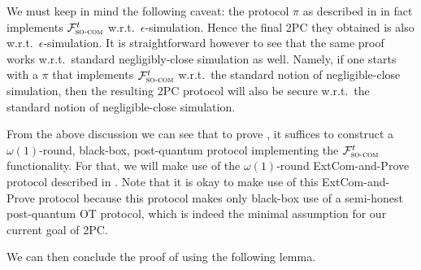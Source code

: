 We must keep in mind the following caveat: the protocol $\pi$ as described in \cite[Section 7.4]{C:CCLY22} in fact implements $\mathcal{F}^t_\textsc{so-com}$ w.r.t.\ $\epsilon$-simulation. Hence the final 2PC they obtained is also w.r.t.\ $\epsilon$-simulation. It is straightforward however to see that the same proof works w.r.t.\ standard negligibly-close simulation as well. Namely, if one starts with a $\pi$ that implements $\mathcal{F}^t_\textsc{so-com}$ w.r.t.\ the standard notion of negligible-close simulation, then the resulting 2PC protocol will also be secure w.r.t.\ the standard notion of negligible-close simulation.


 From the above discussion we can see that to prove , it suffices to construct a $\omega(1)$-round, black-box, post-quantum protocol implementing the $\mathcal{F}^t_\textsc{so-com}$ functionality. For that, we will make use of the $\omega(1)$-round ExtCom-and-Prove protocol described in . Note that it is okay to make use of this ExtCom-and-Prove protocol because this protocol makes only black-box use of a semi-honest post-quantum OT protocol, which is indeed the minimal assumption for our current goal of 2PC.

We can then conclude the proof of  using the following lemma.

